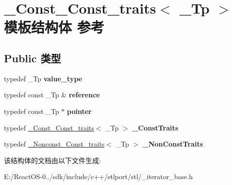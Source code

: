 \hypertarget{struct___const___const__traits}{}\section{\+\_\+\+Const\+\_\+\+Const\+\_\+traits$<$ \+\_\+\+Tp $>$ 模板结构体 参考}
\label{struct___const___const__traits}
\subsection*{Public 类型}
\begin{DoxyCompactItemize}
\item 
\mbox{\label{struct___const___const__traits_a5ec1b6a1a4937beffb0818668ae6287d}} 
typedef \+\_\+\+Tp {\bfseries value\+\_\+type}
\item 
\mbox{\label{struct___const___const__traits_a014d0f44f652daa05b5f7eff395a2f4e}} 
typedef const \+\_\+\+Tp \& {\bfseries reference}
\item 
\mbox{\label{struct___const___const__traits_ad8f20c040c4c91e293a439930e157861}} 
typedef const \+\_\+\+Tp $\ast$ {\bfseries pointer}
\item 
\mbox{\label{struct___const___const__traits_adca1096d72bd25aad9355b15f7dfc0f5}} 
typedef \hyperlink{struct___const___const__traits}{\+\_\+\+Const\+\_\+\+Const\+\_\+traits}$<$ \+\_\+\+Tp $>$ {\bfseries \+\_\+\+Const\+Traits}
\item 
\mbox{\label{struct___const___const__traits_a17784b16ccc41c4ff8b694c6b10f1441}} 
typedef \hyperlink{struct___nonconst___const__traits}{\+\_\+\+Nonconst\+\_\+\+Const\+\_\+traits}$<$ \+\_\+\+Tp $>$ {\bfseries \+\_\+\+Non\+Const\+Traits}
\end{DoxyCompactItemize}


该结构体的文档由以下文件生成\+:\begin{DoxyCompactItemize}
\item 
E\+:/\+React\+O\+S-\/0../sdk/include/c++/stlport/stl/\+\_\+iterator\+\_\+base.\+h\end{DoxyCompactItemize}
